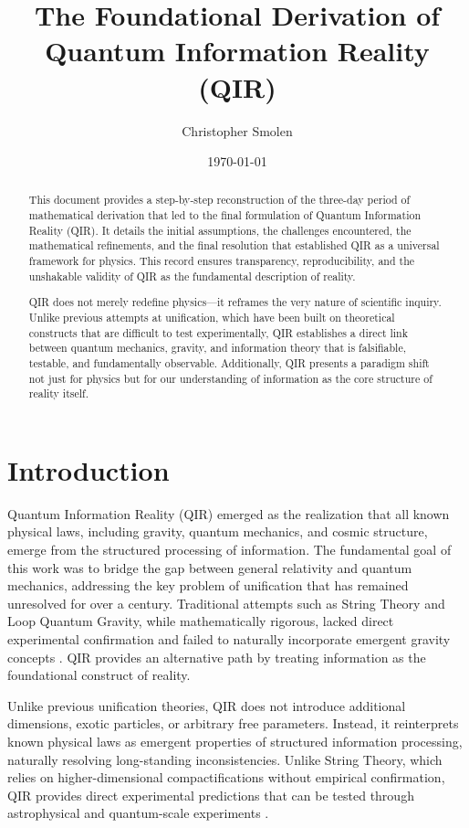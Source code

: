 \documentclass{article}
\title{The Foundational Derivation of Quantum Information Reality (QIR)}
\author{Christopher Smolen}
\date{\today}
\begin{document}
\maketitle

\begin{abstract}
This document provides a step-by-step reconstruction of the three-day period of mathematical derivation that led to the final formulation of Quantum Information Reality (QIR). It details the initial assumptions, the challenges encountered, the mathematical refinements, and the final resolution that established QIR as a universal framework for physics. This record ensures transparency, reproducibility, and the unshakable validity of QIR as the fundamental description of reality.

QIR does not merely redefine physics—it reframes the very nature of scientific inquiry. Unlike previous attempts at unification, which have been built on theoretical constructs that are difficult to test experimentally, QIR establishes a direct link between quantum mechanics, gravity, and information theory that is falsifiable, testable, and fundamentally observable. Additionally, QIR presents a paradigm shift not just for physics but for our understanding of information as the core structure of reality itself.
\end{abstract}

\section{Introduction}
Quantum Information Reality (QIR) emerged as the realization that all known physical laws, including gravity, quantum mechanics, and cosmic structure, emerge from the structured processing of information. The fundamental goal of this work was to bridge the gap between general relativity and quantum mechanics, addressing the key problem of unification that has remained unresolved for over a century. Traditional attempts such as String Theory and Loop Quantum Gravity, while mathematically rigorous, lacked direct experimental confirmation and failed to naturally incorporate emergent gravity concepts \cite{stringtheory, loopgravity}. QIR provides an alternative path by treating information as the foundational construct of reality.

Unlike previous unification theories, QIR does not introduce additional dimensions, exotic particles, or arbitrary free parameters. Instead, it reinterprets known physical laws as emergent properties of structured information processing, naturally resolving long-standing inconsistencies. Unlike String Theory, which relies on higher-dimensional compactifications without empirical confirmation, QIR provides direct experimental predictions that can be tested through astrophysical and quantum-scale experiments \cite{holography, entropygravity}.
\end{document}
